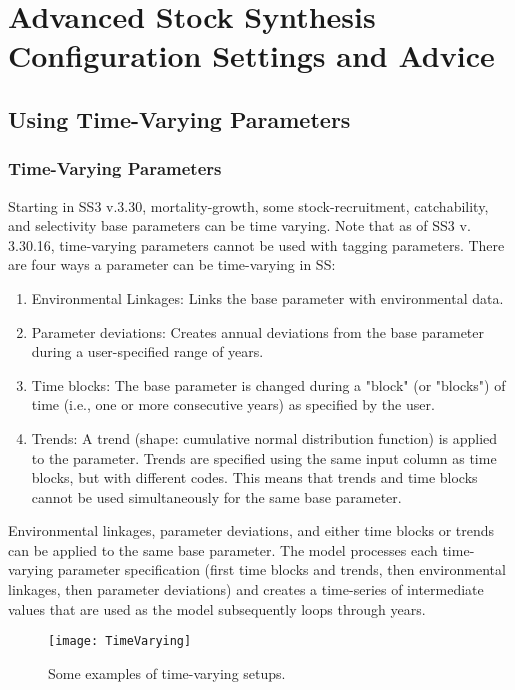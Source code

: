 \section{Advanced Stock Synthesis Configuration Settings and Advice}

\hypertarget{TVpara}{}
\subsection{Using Time-Varying Parameters}

\hypertarget{tvOrder}{}
\subsubsection{Time-Varying Parameters}

Starting in SS3 v.3.30, mortality-growth, some stock-recruitment, catchability, and selectivity base parameters can be time varying. Note that as of SS3 v. 3.30.16, time-varying parameters cannot be used with tagging parameters. There are four ways a parameter can be time-varying in SS:
\begin{enumerate}
    \item Environmental Linkages: Links the base parameter with environmental data.
	\item Parameter deviations: Creates annual deviations from the base parameter during a user-specified range of years.
	\item Time blocks: The base parameter is changed during a "block" (or "blocks") of time (i.e., one or more consecutive years) as specified by the user.
	\item Trends: A trend (shape: cumulative normal distribution function) is applied to the parameter. Trends are specified using the same input column as time blocks, but with different codes. This means that trends and time blocks cannot be used simultaneously for the same base parameter.
\end{enumerate}

Environmental linkages, parameter deviations, and either time blocks or trends can be applied to the same base parameter. The model processes each time-varying parameter specification (first time blocks and trends, then environmental linkages, then parameter deviations) and creates a time-series of intermediate values that are used as the model subsequently loops through years.

\begin{figure}[h]
	\begin{center}
		\texttt{[image: TimeVarying]}\\
	\end{center}
	\caption{Some examples of time-varying setups.}
	\label{(fig:timevarying)}
\end{figure}

